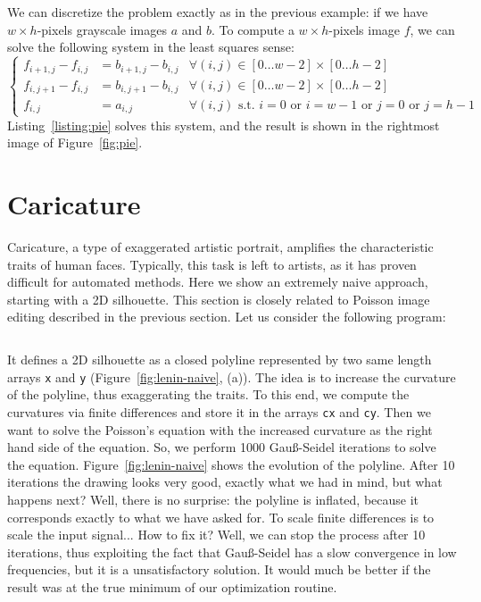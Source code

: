 \documentclass[notitlepage,oneside]{book}
\begin{document}
We can discretize the problem exactly as in the previous example: if we have $w \times h$-pixels grayscale images $a$ and $b$.
To compute a $w \times h$-pixels image $f$, we can solve the following system in the least squares sense:
\begin{equation}
\label{eq:pie}
\left \{ \begin{array}{rll}
f_{i+1, j}-f_{i,j} & = b_{i+1, j}-b_{i,j} & \forall (i,j) \in [0 \dots w-2] \times [0\dots h-2]\\
f_{i, j+1}-f_{i,j} & = b_{i, j+1}-b_{i,j} & \forall (i,j) \in [0 \dots w-2] \times [0\dots h-2]\\
f_{i,j}            & = a_{i,j}            & \forall (i,j) \text{~s.t.~} i=0 \text{~or~} i=w-1 \text{~or~} j=0 \text{~or~} j=h-1
\end{array} \right.
\end{equation}
Listing~\ref{listing:pie} solves this system, and the result is shown in the rightmost image of Figure~\ref{fig:pie}.



\section{Caricature}
\label{sec:caricature}
Caricature, a type of exaggerated artistic portrait, amplifies the characteristic traits of human faces.
Typically, this task is left to artists, as it has proven difficult for automated methods.
Here we show an extremely naive approach, starting with a 2D silhouette.
This section is closely related to Poisson image editing described in the previous section.
Let us consider the following program:
\inputminted[frame=single,linenos=true]{python}{listings/example_6.2_a.py}

It defines a 2D silhouette as a closed polyline represented by two same length arrays \texttt{x} and \texttt{y} (Figure~\ref{fig:lenin-naive}, (a)).
The idea is to increase the curvature of the polyline, thus exaggerating the traits.
To this end, we compute the curvatures via finite differences and store it in the arrays \texttt{cx} and \texttt{cy}.
Then we want to solve the Poisson's equation with the increased curvature as the right hand side of the equation.
So, we perform 1000 Gauß-Seidel iterations to solve the equation. Figure~\ref{fig:lenin-naive} shows the evolution of the polyline.
After 10 iterations the drawing looks very good, exactly what we had in mind, but what happens next?
Well, there is no surprise: the polyline is inflated, because it corresponds exactly to what we have asked for.
To scale finite differences is to scale the input signal... How to fix it?
Well, we can stop the process after 10 iterations, thus exploiting the fact that Gauß-Seidel has a slow convergence in low frequencies, but it is a unsatisfactory solution.
It would much be better if the result was at the true minimum of our optimization routine.
\end{document}
